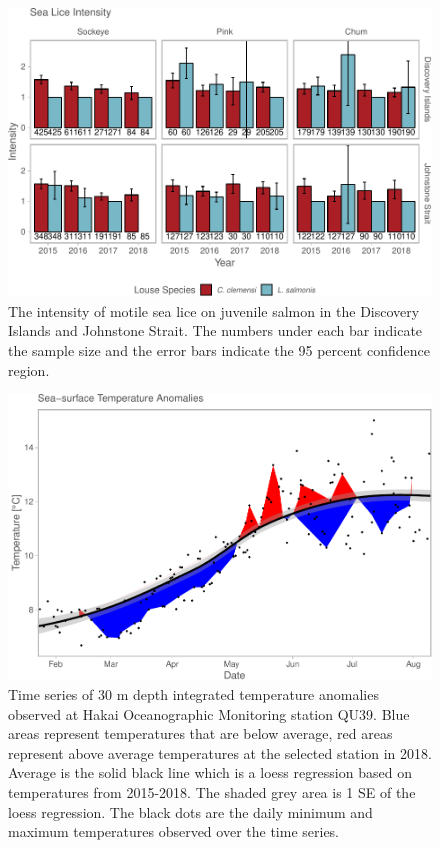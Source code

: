 \documentclass[fleqn,10pt]{wlpeerj} %
\begin{document}
\begin{figure}[H]
\includegraphics[width=0.9\linewidth]{Migration_Observations_Report_files/figure-latex/sealice-intensity-plot-1} \caption{The intensity of motile sea lice on juvenile salmon in the Discovery Islands and Johnstone Strait. The numbers under each bar indicate the sample size and the error bars indicate the 95 percent confidence region.}\label{fig:sealice-intensity-plot}
\end{figure}

\begin{figure}[H]
\includegraphics[width=0.9\linewidth]{Migration_Observations_Report_files/figure-latex/sst-plot-1} \caption{Time series of 30 m depth integrated temperature anomalies observed at Hakai Oceanographic Monitoring station QU39. Blue areas represent temperatures that are below average, red areas represent above average temperatures at the selected station in 2018. Average is the solid black line which is a loess regression based on temperatures from 2015-2018. The shaded grey area is 1 SE of the loess regression. The black dots are the daily minimum and maximum temperatures observed over the time series.}\label{fig:sst-plot}
\end{figure}
\end{document}
